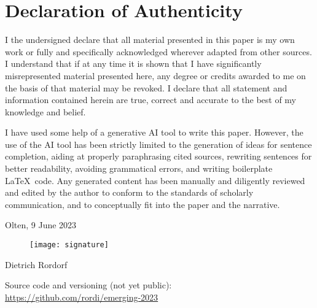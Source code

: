 \section*{Declaration of Authenticity}

I the undersigned declare that all material presented in this paper is my own work or fully
and specifically acknowledged wherever adapted from other sources. I understand that if at any
time it is shown that I have significantly misrepresented material presented here, any degree or
credits awarded to me on the basis of that material may be revoked. I declare that all statement
and information contained herein are true, correct and accurate to the best of my knowledge and
belief.

\vspace*{0.4cm} 

\noindent I have used some help of a generative AI tool to write this paper. However, the use of the AI
tool has been strictly limited to the generation of ideas for sentence completion, aiding at properly
paraphrasing cited sources, rewriting sentences for better readability, avoiding grammatical errors,
and writing boilerplate \LaTeX\ code. Any generated content has been manually and diligently reviewed
and edited by the author to conform to the standards of scholarly communication, and to conceptually
fit into the paper and the narrative.

\vspace*{1cm} 
\noindent Olten, 9 June 2023

\begin{figure}[h!]
    \texttt{[image: signature]}
\end{figure}
\noindent Dietrich Rordorf

\vspace*{2cm} 

\noindent Source code and versioning (not yet public):\\
\url{https://github.com/rordi/emerging-2023}

